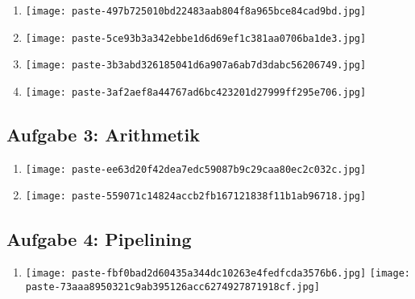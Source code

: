 \documentclass[12pt,a4paper]{article}
\begin{document}
\begin{enumerate}[label=\alph*), topsep=5pt, itemsep=10pt]
\item \mbox{}\begin{center}\texttt{[image: paste-497b725010bd22483aab804f8a965bce84cad9bd.jpg]}
\end{center}
\item \mbox{}\begin{center}\texttt{[image: paste-5ce93b3a342ebbe1d6d69ef1c381aa0706ba1de3.jpg]}
\end{center}
\item \mbox{}\begin{center}\texttt{[image: paste-3b3abd326185041d6a907a6ab7d3dabc56206749.jpg]}
\end{center}
\item \mbox{}\begin{center}\texttt{[image: paste-3af2aef8a44767ad6bc423201d27999ff295e706.jpg]}
\end{center}
\end{enumerate}
\clearpage
\subsection*{Aufgabe 3: Arithmetik}

\begin{enumerate}[label=\alph*), topsep=5pt, itemsep=10pt]
\item \mbox{}\begin{center}\texttt{[image: paste-ee63d20f42dea7edc59087b9c29caa80ec2c032c.jpg]}
\end{center}
\item \mbox{}\begin{center}\texttt{[image: paste-559071c14824accb2fb167121838f11b1ab96718.jpg]}
\end{center}
\end{enumerate}
\clearpage
\subsection*{Aufgabe 4: Pipelining}

\begin{enumerate}[label=\alph*), topsep=5pt, itemsep=10pt]
\item \mbox{}\begin{center}\texttt{[image: paste-fbf0bad2d60435a344dc10263e4fedfcda3576b6.jpg]}
\texttt{[image: paste-73aaa8950321c9ab395126acc6274927871918cf.jpg]}
\end{center}
\end{enumerate}
\clearpage
\end{document}
